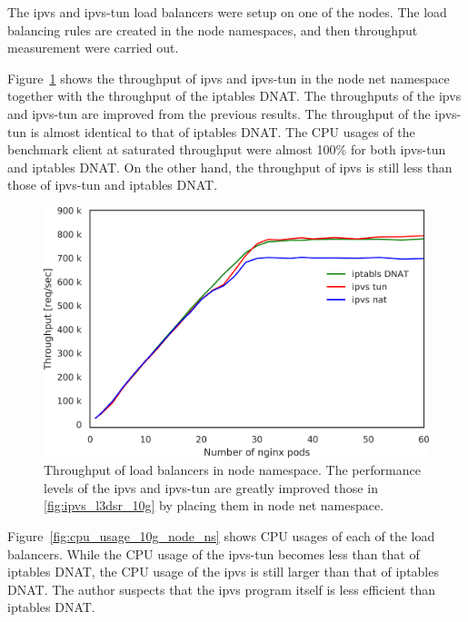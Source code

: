 The ipvs and ipvs-tun load balancers were setup on one of the nodes. 
The load balancing rules are created in the node namespaces, and then throughput measurement were carried out.

Figure~\ref{fig:ipvs_node_l3dsr_10g} shows the throughput of ipvs and ipvs-tun in the node net namespace together with the throughput of the iptables DNAT.
The throughputs of the ipvs and ipvs-tun are improved from the previous results.
The throughput of the ipvs-tun is almost identical to that of iptables DNAT.
The CPU usages of the benchmark client at saturated throughput were almost 100\% for both ipvs-tun and iptables DNAT. 
On the other hand, the throughput of ipvs is still less than those of ipvs-tun and iptables DNAT.

\begin{figure}[h]
  \centering
  \includegraphics[width=0.8\columnwidth]{Figs/ipvs_node_l3dsr_10g}
  \par\bigskip
  \centering
  \begin{minipage}{0.9\columnwidth}
    \caption[Throughput of load balancers in node namespace]{
      Throughput of load balancers in node namespace.
      The performance levels of the ipvs and ipvs-tun are greatly improved those in \ref{fig:ipvs_l3dsr_10g} by placing them in node net namespace.
    }
    \label{fig:ipvs_node_l3dsr_10g}
  \end{minipage}
\end{figure}

Figure~\ref{fig:cpu_usage_10g_node_ns} shows CPU usages of each of the load balancers.
While the CPU usage of the ipvs-tun becomes less than that of iptables DNAT, the CPU usage of the ipvs is still larger than that of iptables DNAT.
The author suspects that the ipvs program itself is less efficient than iptables DNAT.


